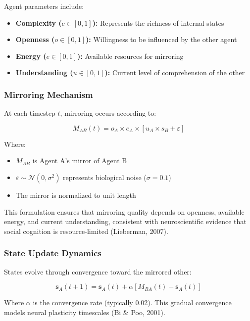 \documentclass[12pt]{article}
\begin{document}
Agent parameters include:
\begin{itemize}
\item \textbf{Complexity ($c \in [0,1]$):} Represents the richness of internal states
\item \textbf{Openness ($o \in [0,1]$):} Willingness to be influenced by the other agent
\item \textbf{Energy ($e \in [0,1]$):} Available resources for mirroring
\item \textbf{Understanding ($u \in [0,1]$):} Current level of comprehension of the other
\end{itemize}

\subsubsection{Mirroring Mechanism}

At each timestep $t$, mirroring occurs according to:

\begin{equation}
M_{AB}(t) = o_A \times e_A \times [u_A \times s_B + \varepsilon]
\end{equation}

Where:
\begin{itemize}
\item $M_{AB}$ is Agent A's mirror of Agent B
\item $\varepsilon \sim \mathcal{N}(0, \sigma^2)$ represents biological noise ($\sigma = 0.1$)
\item The mirror is normalized to unit length
\end{itemize}

This formulation ensures that mirroring quality depends on openness, available energy, and current understanding, consistent with neuroscientific evidence that social cognition is resource-limited (Lieberman, 2007).

\subsubsection{State Update Dynamics}

States evolve through convergence toward the mirrored other:

\begin{equation}
\mathbf{s}_A(t+1) = \mathbf{s}_A(t) + \alpha[M_{BA}(t) - \mathbf{s}_A(t)]
\end{equation}

Where $\alpha$ is the convergence rate (typically 0.02). This gradual convergence models neural plasticity timescales (Bi \& Poo, 2001).
\end{document}
